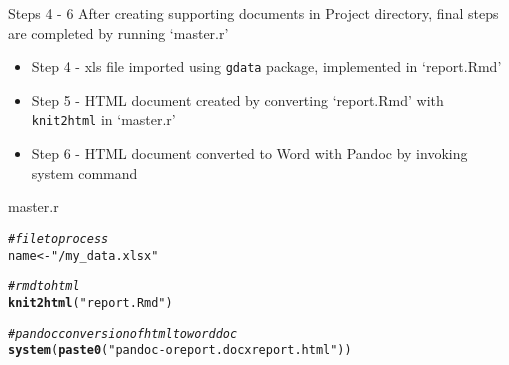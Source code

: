 \documentclass[xcolor=svgnames]{beamer}\usepackage[]{graphicx}\usepackage[]{color}
\makeatletter
\newcommand{\hlstr}[1]{\textcolor[rgb]{0.192,0.494,0.8}{#1}}%
\newcommand{\hlcom}[1]{\textcolor[rgb]{0.678,0.584,0.686}{\textit{#1}}}%
\newcommand{\hlstd}[1]{\textcolor[rgb]{0.345,0.345,0.345}{#1}}%
\newcommand{\hlkwb}[1]{\textcolor[rgb]{0.69,0.353,0.396}{#1}}%
\newcommand{\hlkwd}[1]{\textcolor[rgb]{0.737,0.353,0.396}{\textbf{#1}}}%
\newenvironment{kframe}{%
 \def\at@end@of@kframe{}%
 \ifinner\ifhmode%
  \def\at@end@of@kframe{\end{minipage}}%
  \begin{minipage}{\columnwidth}%
 \fi\fi%
 \def\FrameCommand##1{\hskip\@totalleftmargin \hskip-\fboxsep
 \colorbox{shadecolor}{##1}\hskip-\fboxsep
     \hskip-\linewidth \hskip-\@totalleftmargin \hskip\columnwidth}%
 \MakeFramed {\advance\hsize-\width
   \@totalleftmargin\z@ \linewidth\hsize
   \@setminipage}}%
 {\par\unskip\endMakeFramed%
 \at@end@of@kframe}
\newenvironment{knitrout}{}{} %
\makeatother
\begin{document}
\begin{frame}[fragile]{Steps 4 - 6}
\small
After creating supporting documents in Project directory, final steps are completed by running `master.r'
\begin{itemize}
\item Step 4 - xls file imported using \texttt{gdata} package, implemented in `report.Rmd'
\item Step 5 - HTML document created by converting `report.Rmd' with \texttt{knit2html} in `master.r'
\item Step 6 - HTML document converted to Word with Pandoc by invoking system command
\end{itemize}
\begin{block}{master.r}
\begin{knitrout}
\color{fgcolor}\begin{kframe}
\begin{alltt}
\hlcom{# file to process}
\hlstd{name} \hlkwb{<-} \hlstr{"/my_data.xlsx"}

\hlcom{# rmd to html}
\hlkwd{knit2html}\hlstd{(}\hlstr{"report.Rmd"}\hlstd{)}

\hlcom{# pandoc conversion of html to word doc}
\hlkwd{system}\hlstd{(}\hlkwd{paste0}\hlstd{(}\hlstr{"pandoc -o report.docx report.html"}\hlstd{))}
\end{alltt}
\end{kframe}
\end{knitrout}

\end{block}
\end{frame}
\end{document}
